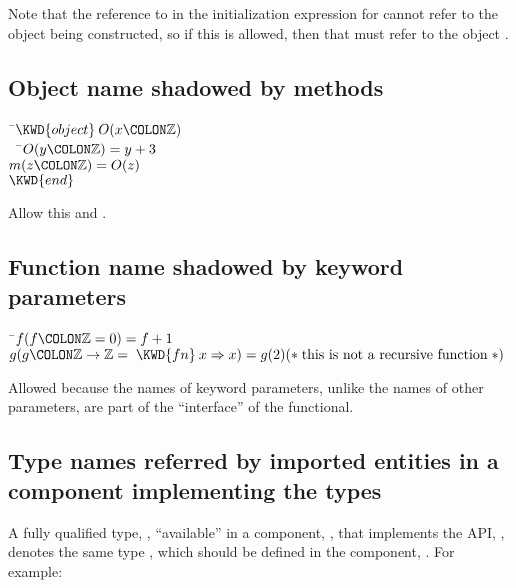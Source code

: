 Note that the reference to  in the initialization expression for
 cannot refer to the object being constructed, so if this is allowed, then that
 must refer to the object .

\subsection{Object name shadowed by methods}
\begin{Fortress}
{\tt~}\pushtabs\=\+\( \KWD{object}\:O(x\COLON \mathbb{Z})\)\\
{\tt~~}\pushtabs\=\+\(   O(y\COLON \mathbb{Z}) = y+3\)\\
\(   m(z\COLON \mathbb{Z}) = O(z)\)\-\\\poptabs
\( \KWD{end}\)\-\\\poptabs
\end{Fortress}

Allow this and .

\subsection{Function name shadowed by keyword parameters}
\begin{Fortress}
{\tt~}\pushtabs\=\+\( f(f\COLON \mathbb{Z} = 0) = f+1\)\\
\( g(g\COLON \mathbb{Z}\rightarrow\mathbb{Z} = \;\KWD{fn}\:x \Rightarrow x) = g(2)       \mathtt{(*}\;\hbox{\rm  this is not a recursive function \unskip}\;\mathtt{*)}\)\-\\\poptabs
\end{Fortress}

Allowed because the names of keyword parameters, unlike the names of other parameters,
are part of the ``interface'' of the functional.

\subsection{Type names referred by imported entities in a component implementing the types}

A fully qualified type, , ``available'' in a component,
, that implements the API, ,
denotes the same type , which should be defined in the component,
.  For example:

